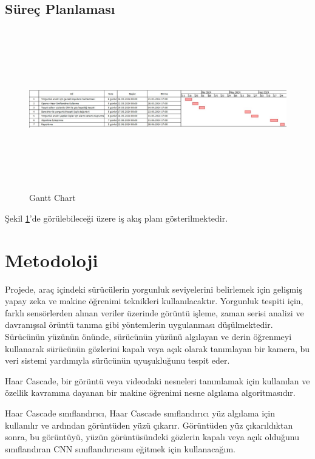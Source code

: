 \documentclass[12pt, a4paper]{report}
\begin{document}
	\begin{landscape}
		\section{Süreç Planlaması}
	\begin{figure}[!htbp] %
		\centering
		\includegraphics[height=7cm, width=27cm]{gantt.jpg}
		\caption{Gantt Chart}		   	
		\label{gantt}
	\end{figure}
	Şekil \ref{gantt}'de görülebileceği üzere
	iş akış planı gösterilmektedir.
\end{landscape}
\pagebreak 
\section{Metodoloji}
Projede, araç içindeki sürücülerin yorgunluk seviyelerini belirlemek için gelişmiş yapay zeka ve makine öğrenimi teknikleri kullanılacaktır. Yorgunluk tespiti için, farklı sensörlerden alınan veriler üzerinde görüntü işleme, zaman serisi analizi ve davranışsal örüntü tanıma gibi yöntemlerin uygulanması düşülmektedir.
Sürücünün yüzünün önünde, sürücünün yüzünü algılayan ve derin öğrenmeyi kullanarak sürücünün gözlerini kapalı veya açık olarak tanımlayan bir kamera, bu veri sistemi yardımıyla sürücünün uyuşukluğunu tespit eder.\par
 Haar Cascade, bir görüntü veya videodaki nesneleri tanımlamak için kullanılan ve özellik kavramına dayanan bir makine öğrenimi nesne algılama algoritmasıdır.\par
  Haar Cascade sınıflandırıcı, Haar Cascade sınıflandırıcı yüz algılama için kullanılır ve ardından görüntüden yüzü çıkarır. Görüntüden yüz çıkarıldıktan sonra, bu görüntüyü, yüzün görüntüsündeki gözlerin kapalı veya açık olduğunu sınıflandıran CNN sınıflandırıcısını eğitmek için kullanacağım.
\end{document}
